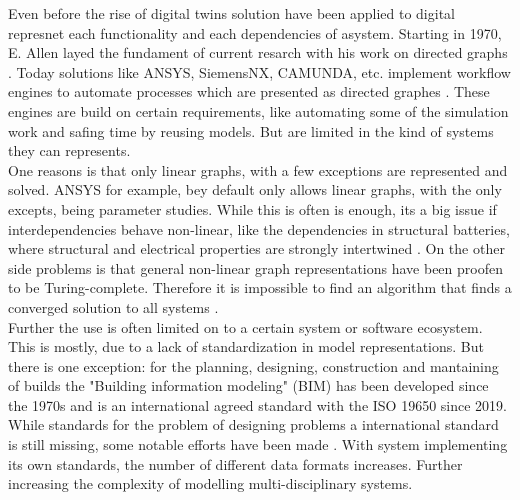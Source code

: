 Even before the rise of digital twins \cite{Leitenberger2021} solution have been applied to digital represnet each functionality and each dependencies of asystem.
Starting in 1970, E. Allen layed the fundament of current resarch with his work on directed graphs \cite{allen_control_1970}.
Today solutions like ANSYS, SiemensNX, CAMUNDA, etc. implement workflow engines to automate processes which are presented as directed graphes \cite{noauthor_dynamo_2020, noauthor_function_2020, noauthor_systems_2020}.
These engines are build on certain requirements, like automating some of the simulation work and safing time by reusing models.
But are limited in the kind of systems they can represents.\\
One reasons is that only linear graphs, with a few exceptions are represented and solved.
ANSYS for example, bey default only allows linear graphs, with the only excepts, being parameter studies.
While this is often is enough, its a big issue if interdependencies behave non-linear, like the dependencies in structural batteries, 
where structural and electrical properties are strongly intertwined \cite{Asp2021}.
On the other side problems is that general non-linear graph representations have been proofen to be Turing-complete.
Therefore it is impossible to find an algorithm that finds a converged solution to all systems \cite{Ajtai1990}.\\
Further the use is often limited on to a certain system or software ecosystem.
This is mostly, due to a lack of standardization in model representations.
But there is one exception: for the planning, designing, construction and mantaining of builds the 
"Building information modeling" (BIM) has been developed since the 1970s and is an international agreed standard with the ISO 19650 since 2019.
While standards for the problem of designing problems a international standard is still missing, some notable efforts have been made \cite{noauthor_modelica_nodate, mukherjee_hierarchical_1999,  Berschik2021}.
With system implementing its own standards, the number of different data formats increases.
Further increasing the complexity of modelling multi-disciplinary systems.

